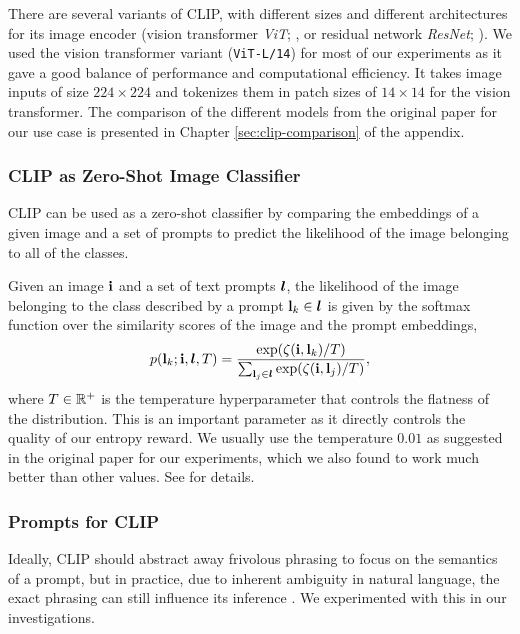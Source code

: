 There are several variants of CLIP, with different sizes and different architectures for its image encoder (vision transformer \emph{ViT}; \cite{vit}, or residual network \emph{ResNet}; \cite{resnet}).
We used the vision transformer variant (\texttt{ViT-L/14}) for most of our experiments as it gave a good balance of performance and computational efficiency.
It takes image inputs of size \(224 \times 224\) and tokenizes them in patch sizes of \(14 \times 14\) for the vision transformer.
The comparison of the different models from the original paper for our use case is presented in Chapter \ref{sec:clip-comparison} of the appendix.

\subsubsection{CLIP as Zero-Shot Image Classifier}
\label{sec:clip-classifier}
CLIP can be used as a zero-shot classifier by comparing the embeddings of a given image and a set of prompts to predict the likelihood of the image belonging to all of the classes.

Given an image \(\mathbf{i}\) and a set of text prompts \(\bm{l}\), the likelihood of the image belonging to the class described by a prompt \(\mathbf{l}_k \in \bm{l}\) is given by the softmax function over the similarity scores of the image and the prompt embeddings,
\begin{equation}
    \label{eq:clip-dist}
    p(\mathbf{l}_k; \mathbf{i}, \bm{l}, T) = \dfrac{\exp(\zeta(\mathbf{i}, \mathbf{l}_k)/T)}{\sum_{\mathbf{l}_j \in \bm{l}} \exp(\zeta(\mathbf{i}, \mathbf{l}_j)/T)},
\end{equation}
where \(T \in \mathbb{R}^+\) is the temperature hyperparameter that controls the flatness of the distribution.
This is an important parameter as it directly controls the quality of our entropy reward.
We usually use the temperature \(0.01\) as suggested in the original paper for our experiments, which we also found to work much better than other values.
See  for details.

\subsubsection{Prompts for CLIP}
\label{sec:prompt-engineering}
Ideally, CLIP should abstract away frivolous phrasing to focus on the semantics of a prompt, but in practice, due to inherent ambiguity in natural language, the exact phrasing can still influence its inference \citep{waffleclip}. 
We experimented with this in our investigations.

